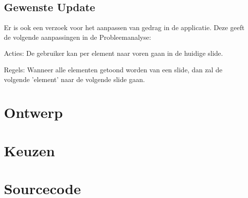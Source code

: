 \documentclass[a4paper]{article}
\begin{document}
\subsection{Gewenste Update}
Er is ook een verzoek voor het aanpassen van gedrag in de applicatie. Deze geeft
de volgende aanpassingen in de Probleemanalyse:

Acties: De gebruiker kan per element naar voren gaan in de huidige slide.

Regels: Wanneer alle elementen getoond worden van een slide, dan zal de volgende
'element' naar de volgende slide gaan.

\section{Ontwerp}


\section{Keuzen}



\section{Sourcecode}
\end{document}
